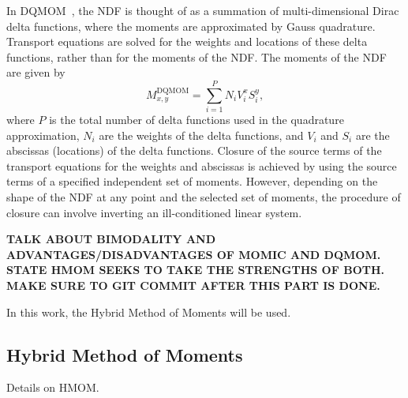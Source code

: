 In DQMOM~\cite{marchisio2005}, the NDF is thought of as a summation of multi-dimensional Dirac delta functions, where the moments are approximated by Gauss quadrature. Transport equations are solved for the weights and locations of these delta functions, rather than for the moments of the NDF. The moments of the NDF are given by
\begin{equation}\label{eq:lesmodels:soot:ndf:dqmom}
  M_{x,y}^{\text{DQMOM}} = \sum\limits_{i=1}^{P} N_i V_i^x S_i^y,
\end{equation}
where $P$ is the total number of delta functions used in the quadrature approximation, $N_i$ are the weights of the delta functions, and $V_i$ and $S_i$ are the abscissas (locations) of the delta functions. Closure of the source terms of the transport equations for the weights and abscissas is achieved by using the source terms of a specified independent set of moments. However, depending on the shape of the NDF at any point and the selected set of moments, the procedure of closure can involve inverting an ill-conditioned linear system.

\textbf{TALK ABOUT BIMODALITY AND ADVANTAGES/DISADVANTAGES OF MOMIC AND DQMOM. STATE HMOM SEEKS TO TAKE THE STRENGTHS OF BOTH. MAKE SURE TO GIT COMMIT AFTER THIS PART IS DONE.}

In this work, the Hybrid Method of Moments will be used.

\subsection{Hybrid Method of Moments}
\label{sec:lesmodels:soot:hmom}

Details on HMOM.
